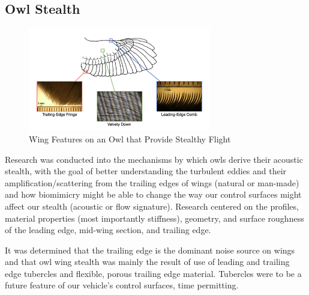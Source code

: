 \documentclass{report}
\begin{document}
\subsection{Owl Stealth}
\begin{figure}[h]
\centering
\includegraphics[width=8cm]{"Owl Stealth"}
\caption{Wing Features on an Owl that Provide Stealthy Flight}
\end{figure}
Research was conducted into the mechanisms by which owls derive their acoustic stealth, with the goal of better understanding the turbulent eddies and their amplification/scattering from the trailing edges of wings (natural or man-made) and how biomimicry might be able to change the way our control surfaces might affect our stealth (acoustic or flow signature).  Research centered on the profiles, material properties (most importantly stiffness), geometry, and surface roughness of the leading edge, mid-wing section, and trailing edge.\par
It was determined that the trailing edge is the dominant noise source on wings and that owl wing stealth was mainly the result of use of leading and trailing edge tubercles and flexible, porous trailing edge material.  Tubercles were to be a future feature of our vehicle's control surfaces, time permitting.
\end{document}
